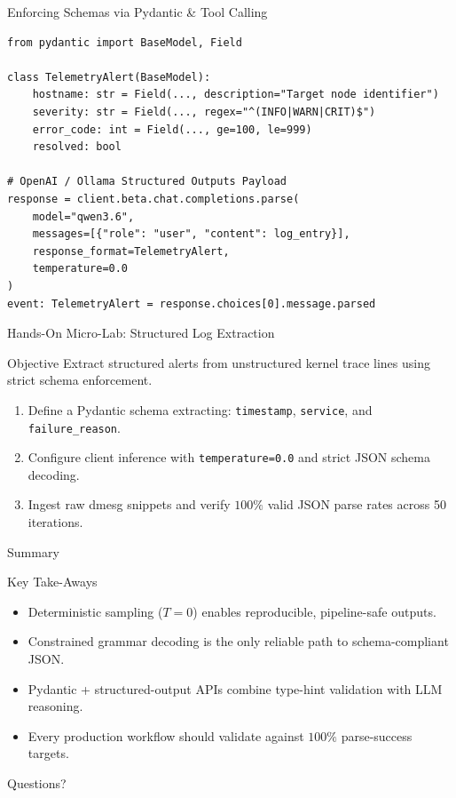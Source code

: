 \documentclass[xcolor=x11names,aspectratio=169]{beamer}
\begin{document}
\begin{frame}[fragile]{Enforcing Schemas via Pydantic \& Tool Calling}
\begin{lstlisting}[style=pycode]
from pydantic import BaseModel, Field

class TelemetryAlert(BaseModel):
    hostname: str = Field(..., description="Target node identifier")
    severity: str = Field(..., regex="^(INFO|WARN|CRIT)$")
    error_code: int = Field(..., ge=100, le=999)
    resolved: bool

# OpenAI / Ollama Structured Outputs Payload
response = client.beta.chat.completions.parse(
    model="qwen3.6",
    messages=[{"role": "user", "content": log_entry}],
    response_format=TelemetryAlert,
    temperature=0.0
)
event: TelemetryAlert = response.choices[0].message.parsed
\end{lstlisting}
\end{frame}

\begin{frame}{Hands-On Micro-Lab: Structured Log Extraction}
 \begin{block}{Objective}
 Extract structured alerts from unstructured kernel trace lines using strict schema enforcement.
 \end{block}
 \begin{enumerate}
 \item Define a Pydantic schema extracting: \texttt{timestamp}, \texttt{service}, and \texttt{failure\_reason}.
 \item Configure client inference with \texttt{temperature=0.0} and strict JSON schema decoding.
 \item Ingest raw dmesg snippets and verify $100\%$ valid JSON parse rates across 50 iterations.
 \end{enumerate}
\end{frame}

\begin{frame}{Summary}
 \begin{block}{Key Take-Aways}
 \begin{itemize}
 \item Deterministic sampling ($T=0$) enables reproducible, pipeline-safe outputs.
 \item Constrained grammar decoding is the only reliable path to schema-compliant JSON.
 \item Pydantic + structured-output APIs combine type-hint validation with LLM reasoning.
 \item Every production workflow should validate against $100\%$ parse-success targets.
 \end{itemize}
 \end{block}
\end{frame}

\begin{frame}
 \Huge \centering Questions?
\end{frame}
\end{document}

